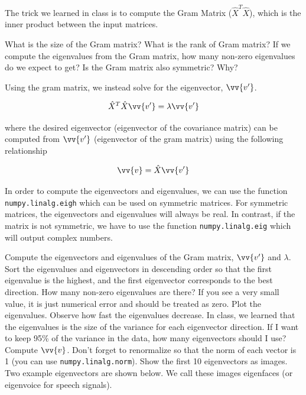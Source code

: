\documentclass{article}
\newcounter{question}
\begin{document}
The trick we learned in class is to compute the Gram Matrix ($\hat{X}^T\hat{X}$), which is the inner product between the input matrices.

\question What is the size of the Gram matrix? What is the rank of Gram matrix? If we compute the eigenvalues from the Gram matrix, how many non-zero eigenvalues do we expect to get?
\question Is the Gram matrix also symmetric? Why?

Using the gram matrix, we instead solve for the eigenvector, $\vv{v'}$.

\begin{equation}
    \hat{X}^T\hat{X} \vv{v'} = \lambda \vv{v'}
\end{equation}

where the desired eigenvector (eigenvector of the covariance matrix) can be computed from $\vv{v'}$ (eigenvector of the gram matrix) using the following relationship

\begin{equation}
    \vv{v} = \hat{X} \vv{v'}
\end{equation}

In order to compute the eigenvectors and eigenvalues, we can use the function \texttt{numpy.linalg.eigh} which can be used on symmetric matrices. For symmetric matrices, the eigenvectors and eigenvalues will always be real. In contrast, if the matrix is not symmetric, we have to use the function \texttt{numpy.linalg.eig} which will output complex numbers.

\question Compute the eigenvectors and eigenvalues of the Gram matrix, $\vv{v'}$ and $\lambda$. Sort the eigenvalues and eigenvectors in descending order so that the first eigenvalue is the highest, and the first eigenvector corresponds to the best direction. How many non-zero eigenvalues are there? If you see a very small value, it is just numerical error and should be treated as zero.
\question Plot the eigenvalues. Observe how fast the eigenvalues decrease. In class, we learned that the eigenvalues is the size of the variance for each eigenvector direction. If I want to keep 95\% of the variance in the data, how many eigenvectors should I use?
\question Compute $\vv{v}$. Don't forget to renormalize so that the norm of each vector is 1 (you can use \texttt{numpy.linalg.norm}). Show the first 10 eigenvectors as images. Two example eigenvectors are shown below. We call these images eigenfaces (or eigenvoice for speech signals).
\end{document}
